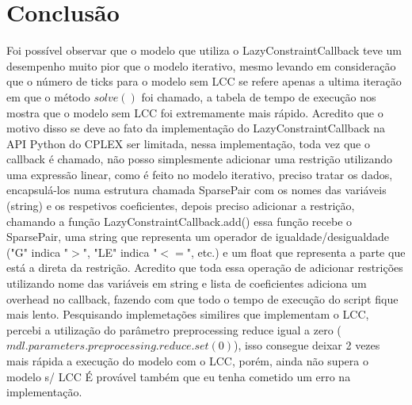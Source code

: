 \documentclass{article}
\begin{document}
    \section{Conclusão}
    Foi possível observar que o modelo que utiliza o LazyConstraintCallback teve um desempenho muito pior que o modelo iterativo,
    mesmo levando em consideração que o número de ticks para o modelo sem LCC se refere apenas a ultima iteração em que o método $solve()$
    foi chamado, a tabela de tempo de execução nos mostra que o modelo sem LCC foi extremamente mais rápido.
    Acredito que o motivo disso se deve ao fato da implementação do LazyConstraintCallback na API Python do CPLEX ser limitada,
    nessa implementação, toda vez que o callback é chamado, não posso simplesmente adicionar uma restrição utilizando uma expressão
    linear, como é feito no modelo iterativo, preciso tratar os dados, encapsulá-los numa estrutura chamada SparsePair com os nomes
    das variáveis (string) e os respetivos coeficientes, depois preciso adicionar a restrição, chamando a função LazyConstraintCallback.add()
    essa função recebe o SparsePair, uma string que representa um operador de igualdade/desigualdade ("G" indica "$>$", "LE" indica "$<=$", etc.)
    e um float que representa a parte que está a direta da restrição.
    Acredito que toda essa operação de adicionar restrições utilizando nome das variáveis em string e lista de coeficientes adiciona um overhead
    no callback, fazendo com que todo o tempo de execução do script fique mais lento.
    Pesquisando implemetações similires que implementam o LCC, percebi a utilização do parâmetro  preprocessing reduce igual a zero ($mdl.parameters.preprocessing.reduce.set(0)$), isso consegue deixar 2 vezes mais rápida a execução do modelo com o LCC, porém, ainda não supera o modelo s/ LCC
    É provável também que eu tenha cometido um erro na implementação.    
\end{document}
